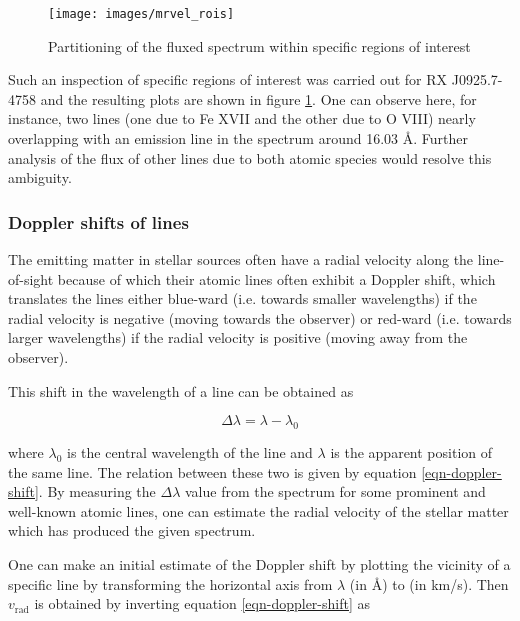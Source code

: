                 \begin{figure}[h!]
    				\centering
    				\caption{Partitioning of the fluxed spectrum within specific regions of interest}
    				\label{fig:roi}
    				\texttt{[image: images/mrvel\_rois]}
			    \end{figure}
                
                Such an inspection of specific regions of interest was carried out for RX J0925.7-4758 and the resulting plots are shown in figure \ref{fig:roi}. One can observe here, for instance, two lines (one due to Fe XVII and the other due to O VIII) nearly overlapping with an emission line in the spectrum around 16.03  \AA. Further analysis of the flux of other lines due to both atomic species would resolve this ambiguity.
                
            \subsubsection{Doppler shifts of lines} \label{tool:rgs-files:demonstration:doppler}
                The emitting matter in stellar sources often have a radial velocity along the line-of-sight because of which their atomic lines often exhibit a Doppler shift, which translates the lines either blue-ward (i.e. towards smaller wavelengths) if the radial velocity is negative (moving towards the observer) or red-ward (i.e. towards larger wavelengths) if the radial velocity is positive (moving away from the observer).
                
                This shift in the wavelength of a line can be obtained as
                
                \begin{equation}
                    \Delta\lambda=\lambda-\lambda_0 \label{eqn-doppler-02}
                \end{equation}
                
                where $\lambda_0$ is the central wavelength of the line and $\lambda$ is the apparent position of the same line. The relation between these two is given by equation \ref{eqn-doppler-shift}. By measuring the $\Delta\lambda$ value from the spectrum for some prominent and well-known atomic lines, one can estimate the radial velocity of the stellar matter which has produced the given spectrum.
                
                One can make an initial estimate of the Doppler shift by plotting the vicinity of a specific line by transforming the horizontal  axis from $\lambda$ (in \AA) to  (in km/s). Then $v_\text{rad}$ is obtained by inverting equation \ref{eqn-doppler-shift} as
                

